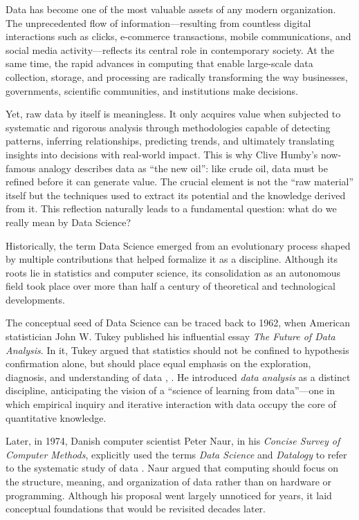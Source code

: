 \documentclass[
  12pt,
  letterpaper,
]{book}
\begin{document}
Data has become one of the most valuable assets of any modern
organization. The unprecedented flow of information---resulting from
countless digital interactions such as clicks, e-commerce transactions,
mobile communications, and social media activity---reflects its central
role in contemporary society. At the same time, the rapid advances in
computing that enable large-scale data collection, storage, and
processing are radically transforming the way businesses, governments,
scientific communities, and institutions make decisions.

Yet, raw data by itself is meaningless. It only acquires value when
subjected to systematic and rigorous analysis through methodologies
capable of detecting patterns, inferring relationships, predicting
trends, and ultimately translating insights into decisions with
real-world impact. This is why Clive Humby's now-famous analogy
describes data as ``the new oil'': like crude oil, data must be refined
before it can generate value. The crucial element is not the ``raw
material'' itself but the techniques used to extract its potential and
the knowledge derived from it. This reflection naturally leads to a
fundamental question: what do we really mean by Data Science?

Historically, the term Data Science emerged from an evolutionary process
shaped by multiple contributions that helped formalize it as a
discipline. Although its roots lie in statistics and computer science,
its consolidation as an autonomous field took place over more than half
a century of theoretical and technological developments.

The conceptual seed of Data Science can be traced back to 1962, when
American statistician John W. Tukey published his influential essay
\emph{The Future of Data Analysis}. In it, Tukey argued that statistics
should not be confined to hypothesis confirmation alone, but should
place equal emphasis on the exploration, diagnosis, and understanding of
data ,
. He introduced \emph{data analysis}
as a distinct discipline, anticipating the vision of a ``science of
learning from data''---one in which empirical inquiry and iterative
interaction with data occupy the core of quantitative knowledge.

Later, in 1974, Danish computer scientist Peter Naur, in his
\emph{Concise Survey of Computer Methods}, explicitly used the terms
\emph{Data Science} and \emph{Datalogy} to refer to the systematic study
of data . Naur argued that
computing should focus on the structure, meaning, and organization of
data rather than on hardware or programming. Although his proposal went
largely unnoticed for years, it laid conceptual foundations that would
be revisited decades later.
\end{document}
